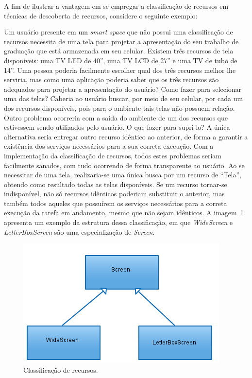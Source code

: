A fim de ilustrar a vantagem em se empregar a classificação de recursos em técnicas de descoberta de recursos, considere o seguinte exemplo:

Um usuário presente em um \emph{smart space} que não possui uma classificação de recursos necessita de uma tela para projetar a apresentação do seu trabalho de graduação que está armazenada em seu celular. Existem três recursos de tela disponíveis: uma TV LED de 40'', uma TV LCD de 27'' e uma TV de tubo de 14''. Uma pessoa poderia facilmente escolher qual dos três recursos melhor lhe serviria, mas como uma aplicação poderia saber que os três recursos são adequados para projetar a apresentação do usuário? Como fazer para selecionar uma das telas? Caberia ao usuário buscar, por meio de seu celular, por cada um dos recursos disponíveis, pois para o ambiente tais telas não possuem relação. Outro problema ocorreria com a saída do ambiente de um dos recursos que estivessem sendo utilizados pelo usuário. O que fazer para supri-lo? A única alternativa seria entregar outro recurso idêntico ao anterior, de forma a garantir a existência dos serviços necessários para a sua correta execução. Com a implementação da classificação de recursos, todos estes problemas seriam facilmente sanados, com tudo ocorrendo de forma transparente ao usuário. Ao se necessitar de uma tela, realizaria-se uma única busca por um recurso de ``Tela'', obtendo como resultado todas as telas disponíveis. Se um recurso tornar-se indisponível, não só recursos idênticos poderiam substituir o anterior, mas também todos aqueles que possuírem os serviços necessários para a correta execução da tarefa em andamento, mesmo que não sejam idênticos. A imagem~\ref{fig:arvoreDeEquivalencia} apresenta um exemplo da estrutura dessa classificação, em que \emph{WideScreen} e \emph{LetterBoxScreen} são uma especialização de \emph{Screen}.

\begin{figure}[ht]
	\center
	\includegraphics[scale=0.8]{imagens/screenTree}
	\caption{Classificação de recursos.}
	\label{fig:arvoreDeEquivalencia}
\end{figure}

